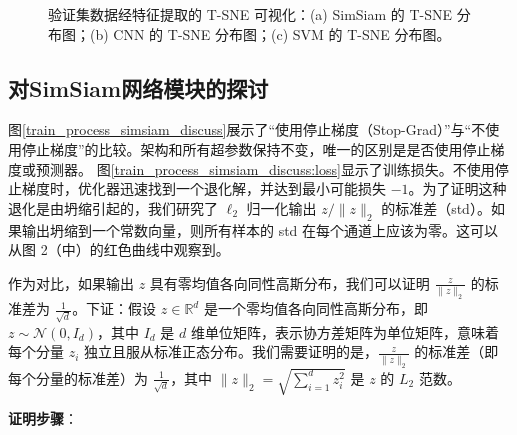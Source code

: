 \documentclass[master]{thesis-uestc}
\begin{document}
\begin{figure}[h]
    \centering
    \caption{验证集数据经特征提取的 T-SNE 可视化：(a) SimSiam 的 T-SNE 分布图；(b) CNN 的 T-SNE 分布图；(c) SVM 的 T-SNE 分布图。}
    \label{tsne_of_all}
\end{figure}

\subsection{对SimSiam网络模块的探讨}
图\ref{train_process_simsiam_discuss}展示了“使用停止梯度（Stop-Grad）”与“不使用停止梯度”的比较。架构和所有超参数保持不变，唯一的区别是是否使用停止梯度或预测器。
图\ref{train_process_simsiam_discuss:loss}显示了训练损失。不使用停止梯度时，优化器迅速找到一个退化解，并达到最小可能损失 \(-1\)。为了证明这种退化是由坍缩引起的，我们研究了 \(\ell_2\) 归一化输出 \( z / \|z\|_2 \) 的标准差（std）。如果输出坍缩到一个常数向量，则所有样本的 std 在每个通道上应该为零。这可以从图 2（中）的红色曲线中观察到。


作为对比，如果输出 \( z \) 具有零均值各向同性高斯分布，我们可以证明 \( \frac{z}{\|z\|_2} \) 的标准差为 \( \frac{1}{\sqrt{d}} \)。下证：假设 \( z \in \mathbb{R}^d \) 是一个零均值各向同性高斯分布，即 \( z \sim \mathcal{N}(0, I_d) \)，其中 \( I_d \) 是 \( d \) 维单位矩阵，表示协方差矩阵为单位矩阵，意味着每个分量 \( z_i \) 独立且服从标准正态分布。我们需要证明的是，\( \frac{z}{\|z\|_2} \) 的标准差（即每个分量的标准差）为 \( \frac{1}{\sqrt{d}} \)，其中 \( \|z\|_2 = \sqrt{\sum_{i=1}^{d} z_i^2} \) 是 \( z \) 的 \( L_2 \) 范数。

\textbf{证明步骤}：
\end{document}
